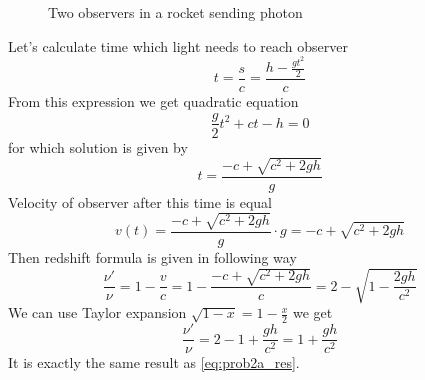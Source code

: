 \subproblem

\begin{wrapfigure}[16]{R}{0.5\linewidth}
    \centering
    \caption{Two observers in a rocket sending photon}
\end{wrapfigure}

Let's calculate time which light needs to reach observer 
%
\begin{equation}
    t = \frac{s}{c} = \frac{h - \frac{gt^2}{2}}{c}
\end{equation}
%
From this expression we get quadratic equation 
%
\begin{equation}
    \frac{g}{2}t^2 + ct - h = 0
\end{equation}
%
for which solution is given by
%
\begin{equation}
    t = \frac{-c + \sqrt{c^2+2gh}}{g}
\end{equation}
%
Velocity of observer  after this time is equal 
%
\begin{equation}
    v(t) = \frac{-c + \sqrt{c^2+2gh}}{g} \cdot g = -c + \sqrt{c^2+2gh}
\end{equation}
%
Then redshift formula is given in following way
%
\begin{equation}
    \frac{\nu'}{\nu} = 1 - \frac{v}{c} = 1 - \frac{-c + \sqrt{c^2+2gh}}{c} = 
    2 - \sqrt{1-\frac{2gh}{c^2}} 
\end{equation}
%
We can use Taylor expansion $\sqrt{1-x} = 1-\frac{x}{2}$ we get
%
\begin{equation}
    \boxed{\frac{\nu'}{\nu} = 2 - 1 + \frac{gh}{c^2} = 1 + \frac{gh}{c^2} }
\end{equation}
%
It is exactly the same result as \autoref{eq:prob2a_res}.